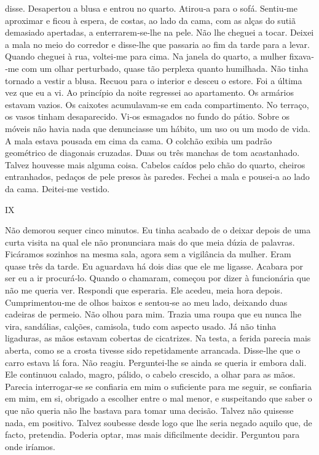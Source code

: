 disse. Desapertou a blusa e entrou no quarto. Atirou­‑a para o sofá.
Sentiu­‑me aproximar e ficou à espera, de costas, ao lado da cama, com
as alças do sutiã demasiado apertadas, a enterrarem­‑se­‑lhe na pele.
Não lhe cheguei a tocar. Deixei a mala no meio do corredor e disse­‑lhe
que passaria ao fim da tarde para a levar. Quando cheguei à rua,
voltei­‑me para cima. Na janela do quarto, a mulher fixava­‑me com um
olhar perturbado, quase tão perplexa quanto humilhada. Não tinha tornado
a vestir a blusa. Recuou para o interior e desceu o estore. Foi a última
vez que eu a vi. Ao princípio da noite regressei ao apartamento. Os
armários estavam vazios. Os caixotes acumulavam­‑se em cada
compartimento. No terraço, os vasos tinham desaparecido. Vi­‑os
esmagados no fundo do pátio. Sobre os móveis não havia nada que
denunciasse um hábito, um uso ou um modo de vida.\\
A mala estava pousada em cima da cama. O colchão exibia um padrão
geométrico de diagonais cruzadas. Duas ou três manchas de tom
acastanhado. Talvez houvesse mais alguma coisa. Cabelos caídos pelo chão
do quarto, cheiros entranhados, pedaços de pele presos às paredes.
Fechei a mala e pousei­‑a ao lado da cama. Deitei­‑me vestido.

IX

Não demorou sequer cinco minutos. Eu tinha acabado de o deixar depois de
uma curta visita na qual ele não pronunciara mais do que meia dúzia de
palavras. Ficáramos sozinhos na mesma sala, agora sem a vigilância da
mulher. Eram quase três da tarde. Eu aguardava há dois dias que ele me
ligasse. Acabara por ser eu a ir procurá­‑lo. Quando o chamaram, começou
por dizer à funcionária que não me queria ver. Respondi que esperaria.
Ele acedeu, meia hora depois. Cumprimentou­‑me de olhos baixos e
sentou­‑se ao meu lado, deixando duas cadeiras de permeio. Não olhou
para mim. Trazia uma roupa que eu nunca lhe vira, sandálias, calções,
camisola, tudo com aspecto usado. Já não tinha ligaduras, as mãos
estavam cobertas de cicatrizes. Na testa, a ferida parecia mais aberta,
como se a crosta tivesse sido repetidamente arrancada. Disse­‑lhe que o
carro estava lá fora. Não reagiu. Perguntei­‑lhe se ainda se queria ir
embora dali. Ele continuou calado, magro, pálido, o cabelo crescido, a
olhar para as mãos. Parecia interrogar­‑se se confiaria em mim o
suficiente para me seguir, se confiaria em mim, em si, obrigado a
escolher entre o mal menor, e suspeitando que saber o que não queria não
lhe bastava para tomar uma decisão. Talvez não quisesse nada, em
positivo. Talvez soubesse desde logo que lhe seria negado aquilo que, de
facto, pretendia. Poderia optar, mas mais dificilmente decidir.
Perguntou para onde iríamos.

